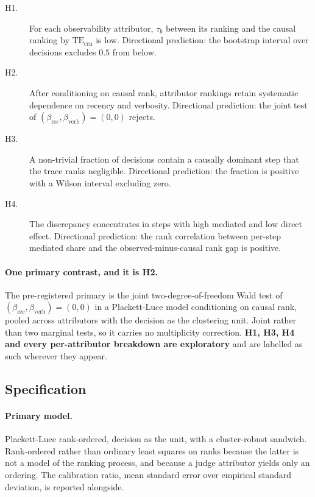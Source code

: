 \documentclass[11pt]{article}
\theoremstyle{remark}
\newcommand{\TEcrn}{\mathrm{TE}_{\mathrm{crn}}}
\begin{document}
\begin{description}
\item[H1.] For each observability attributor, $\tau_b$ between its ranking and
  the causal ranking by $\TEcrn$ is low. Directional prediction: the bootstrap
  interval over decisions excludes $0.5$ from below.
\item[H2.] After conditioning on causal rank, attributor rankings retain
  systematic dependence on recency and verbosity. Directional prediction: the
  joint test of $(\beta_{\mathrm{rec}}, \beta_{\mathrm{verb}}) = (0,0)$ rejects.
\item[H3.] A non-trivial fraction of decisions contain a causally dominant step
  that the trace ranks negligible. Directional prediction: the fraction is
  positive with a Wilson interval excluding zero.
\item[H4.] The discrepancy concentrates in steps with high mediated and low
  direct effect. Directional prediction: the rank correlation between per-step
  mediated share and the observed-minus-causal rank gap is positive.
\end{description}

\paragraph{One primary contrast, and it is H2.} The pre-registered primary is the
joint two-degree-of-freedom Wald test of
$(\beta_{\mathrm{rec}}, \beta_{\mathrm{verb}}) = (0,0)$ in a Plackett-Luce model
conditioning on causal rank, pooled across attributors with the decision as the
clustering unit. Joint rather than two marginal tests, so it carries no
multiplicity correction. \textbf{H1, H3, H4 and every per-attributor breakdown
are exploratory} and are labelled as such wherever they appear.

\subsection{Specification}

\paragraph{Primary model.} Plackett-Luce rank-ordered, decision as the unit, with
a cluster-robust sandwich. Rank-ordered rather than ordinary least squares on
ranks because the latter is not a model of the ranking process, and because a
judge attributor yields only an ordering. The calibration ratio, mean standard
error over empirical standard deviation, is reported alongside.
\end{document}

